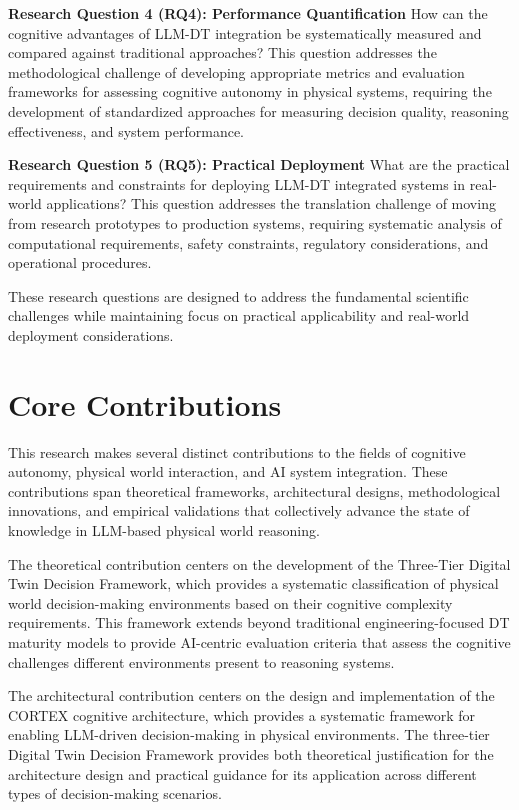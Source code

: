 \textbf{Research Question 4 (RQ4): Performance Quantification}
How can the cognitive advantages of LLM-DT integration be systematically measured and compared against traditional approaches? This question addresses the methodological challenge of developing appropriate metrics and evaluation frameworks for assessing cognitive autonomy in physical systems, requiring the development of standardized approaches for measuring decision quality, reasoning effectiveness, and system performance.

\textbf{Research Question 5 (RQ5): Practical Deployment}
What are the practical requirements and constraints for deploying LLM-DT integrated systems in real-world applications? This question addresses the translation challenge of moving from research prototypes to production systems, requiring systematic analysis of computational requirements, safety constraints, regulatory considerations, and operational procedures.

These research questions are designed to address the fundamental scientific challenges while maintaining focus on practical applicability and real-world deployment considerations.

\section{Core Contributions}

This research makes several distinct contributions to the fields of cognitive autonomy, physical world interaction, and AI system integration. These contributions span theoretical frameworks, architectural designs, methodological innovations, and empirical validations that collectively advance the state of knowledge in LLM-based physical world reasoning.

The theoretical contribution centers on the development of the Three-Tier Digital Twin Decision Framework, which provides a systematic classification of physical world decision-making environments based on their cognitive complexity requirements. This framework extends beyond traditional engineering-focused DT maturity models to provide AI-centric evaluation criteria that assess the cognitive challenges different environments present to reasoning systems.

The architectural contribution centers on the design and implementation of the CORTEX cognitive architecture, which provides a systematic framework for enabling LLM-driven decision-making in physical environments. The three-tier Digital Twin Decision Framework provides both theoretical justification for the architecture design and practical guidance for its application across different types of decision-making scenarios.

